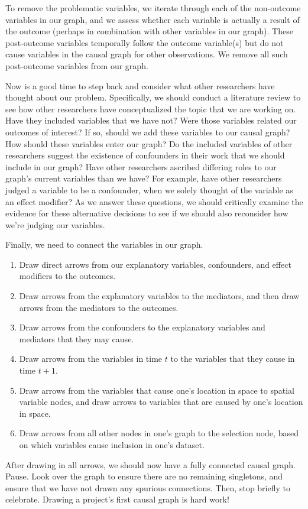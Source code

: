 To remove the problematic variables, we iterate through each of the non-outcome variables in our graph, and we assess whether each variable is actually a result of the outcome (perhaps in combination with other variables in our graph).
These post-outcome variables temporally follow the outcome variable(s) but do not cause variables in the causal graph for other observations.
We remove all such post-outcome variables from our graph.

Now is a good time to step back and consider what other researchers have thought about our problem.
Specifically, we should conduct a literature review to see how other researchers have conceptualized the topic that we are working on.
Have they included variables that we have not?
Were those variables related our outcomes of interest?
If so, should we add these variables to our causal graph? How should these variables enter our graph?
Do the included variables of other researchers suggest the existence of confounders in their work that we should include in our graph?
Have other researchers ascribed differing roles to our graph's current variables than we have?
For example, have other researchers judged a variable to be a confounder, when we solely thought of the variable as an effect modifier?
As we answer these questions, we should critically examine the evidence for these alternative decisions to see if we should also reconsider how we're judging our variables.

Finally, we need to connect the variables in our graph.
\begin{enumerate}
   \item Draw direct arrows from our explanatory variables, confounders, and effect modifiers to the outcomes.
   \item Draw arrows from the explanatory variables to the mediators, and then draw arrows from the mediators to the outcomes.
   \item Draw arrows from the confounders to the explanatory variables and mediators that they may cause.
   \item Draw arrows from the variables in time $t$ to the variables that they cause in time $t+1$.
   \item Draw arrows from the variables that cause one's location in space to spatial variable nodes, and draw arrows to variables that are caused by one's location in space.
   \item Draw arrows from all other nodes in one's graph to the selection node, based on which variables cause inclusion in one's dataset.
\end{enumerate}
After drawing in all arrows, we should now have a fully connected causal graph.
Pause.
Look over the graph to ensure there are no remaining singletons, and ensure that we have not drawn any spurious connections.
Then, stop briefly to celebrate.
Drawing a project's first causal graph is hard work!


